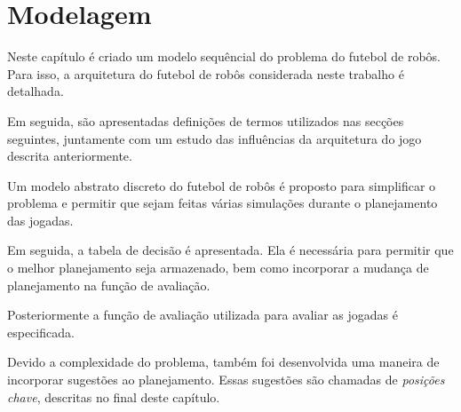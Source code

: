 \chapter{Modelagem}\label{cap:modelagem}

Neste capítulo é criado um modelo sequêncial do problema do futebol
de robôs. Para isso, a arquitetura do futebol de robôs considerada
neste trabalho é detalhada. 

Em seguida, são apresentadas definições de termos utilizados nas
secções seguintes, juntamente com um estudo das influências da
arquitetura do jogo descrita anteriormente.

Um modelo abstrato discreto do futebol de robôs é proposto para simplificar
o problema e permitir que sejam feitas várias simulações durante o
planejamento das jogadas. 

Em seguida, a tabela de decisão é apresentada. Ela é necessária para
permitir que o melhor planejamento seja armazenado, bem como incorporar
a mudança de planejamento na função de avaliação.

Posteriormente a função de avaliação utilizada para avaliar as jogadas
é especificada.

Devido a complexidade do problema, também foi desenvolvida uma maneira de
incorporar sugestões ao planejamento. Essas sugestões são chamadas de
\textit{posições chave}, descritas no final deste capítulo.







